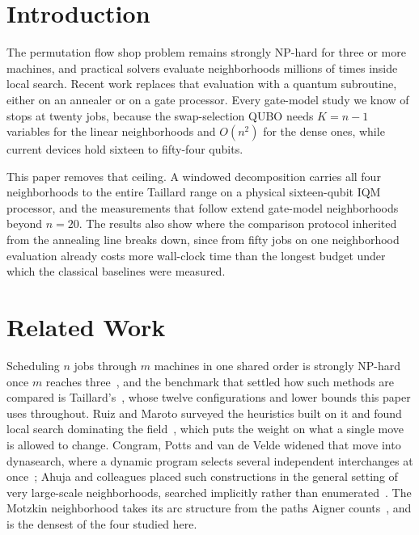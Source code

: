 \documentclass[runningheads]{llncs}
\begin{document}
\section{Introduction}
The permutation flow shop problem remains strongly NP-hard for three or more
machines, and practical solvers evaluate neighborhoods millions of times inside
local search. Recent work replaces that evaluation with a quantum subroutine,
either on an annealer or on a gate processor. Every gate-model study we know of
stops at twenty jobs, because the swap-selection QUBO needs $K = n-1$ variables
for the linear neighborhoods and $O(n^2)$ for the dense ones, while current
devices hold sixteen to fifty-four qubits.

This paper removes that ceiling. A windowed decomposition carries all four
neighborhoods to the entire Taillard range on a physical sixteen-qubit IQM
processor, and the
measurements that follow extend gate-model neighborhoods beyond $n = 20$. The results also show where the comparison protocol inherited from the
annealing line breaks down, since from fifty jobs on one neighborhood evaluation already costs more
wall-clock time than the longest budget under which the classical baselines were
measured.

\section{Related Work}
\label{sec:related}
Scheduling $n$ jobs through $m$ machines in one shared order is strongly
NP-hard once $m$ reaches three~\cite{garey1976}, and the benchmark that
settled how such methods are compared is Taillard's~\cite{taillard1993}, whose
twelve configurations and lower bounds this paper uses throughout. Ruiz and
Maroto surveyed the heuristics built on it and found local search dominating
the field~\cite{ruizmaroto2005}, which puts the weight on what a single move is
allowed to change. Congram, Potts and van de Velde widened that move into
dynasearch, where a dynamic program selects several independent interchanges at
once~\cite{congram2002}; Ahuja and colleagues placed such constructions in the
general setting of very large-scale neighborhoods, searched implicitly rather
than enumerated~\cite{ahuja2002}. The Motzkin neighborhood takes its arc
structure from the paths Aigner counts~\cite{aigner1998}, and is the densest of
the four studied here.
\end{document}
